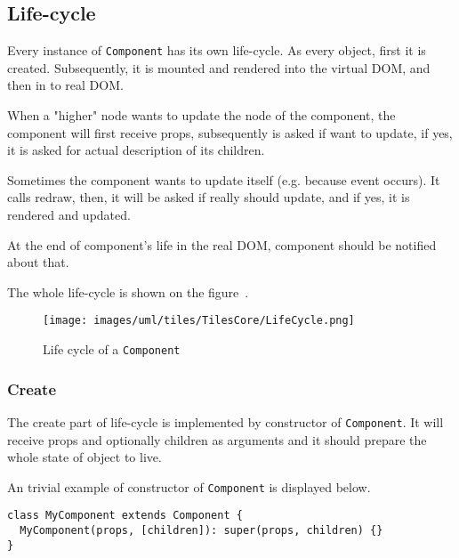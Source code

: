 \documentclass[oneside, 12pt]{book}
\begin{document}
  \subsection{Life-cycle}\label{subsec:our-architecture-lifecycle}

    Every instance of \texttt{Component} has its own life-cycle. 
    As every object, first it is created. 
    Subsequently, it is mounted and rendered into the virtual DOM, and then in to real DOM.

    When a "higher" node wants to update the node of the component, 
		the component will first receive props, 
		subsequently is asked if want to update, 
		if yes, it is asked for actual description of its children. 

    Sometimes the component wants to update itself (e.g. because event occurs).
    It calls redraw, then, it will be asked if really should update, and if yes, it is rendered and updated.

    At the end of component's life in the real DOM, 
    component should be notified about that.

    The whole life-cycle is shown on the figure~.

    \begin{figure}[h]
    \centering  
      \texttt{[image: images/uml/tiles/TilesCore/LifeCycle.png]}
      \caption{Life cycle of a \texttt{Component}}
      \label{img:our-life-cycle}
    \end{figure}

    \subsubsection{Create}\label{subsec:our-architecture-lifecycle-create}

      The create part of life-cycle is implemented by constructor of \texttt{Component}. 
      It will receive props and optionally children as arguments and 
      it should prepare the whole state of object to live.

      An trivial example of constructor of \texttt{Component} is displayed below.
      \begin{verbatim}
class MyComponent extends Component {
  MyComponent(props, [children]): super(props, children) {}
}
      \end{verbatim}

\end{document}
